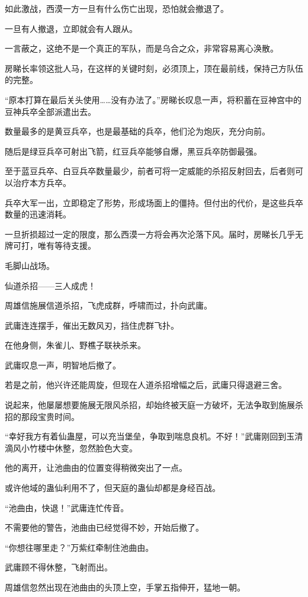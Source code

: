 \begin{this_body}
如此激战，西漠一方一旦有什么伤亡出现，恐怕就会撤退了。

一旦有人撤退，立即就会有人跟从。

一言蔽之，这绝不是一个真正的军队，而是乌合之众，非常容易离心涣散。

房睇长率领这批人马，在这样的关键时刻，必须顶上，顶在最前线，保持己方队伍的完整。

“原本打算在最后关头使用……没有办法了。”房睇长叹息一声，将积蓄在豆神宫中的豆神兵卒全部派遣出去。

数量最多的是黄豆兵卒，也是最基础的兵卒，他们沦为炮灰，充分向前。

随后是绿豆兵卒可射出飞箭，红豆兵卒能够自爆，黑豆兵卒防御最强。

至于蓝豆兵卒、白豆兵卒数量最少，前者可将一定威能的杀招反射回去，后者则可以治疗本方兵卒。

兵卒大军一出，立即稳定了形势，形成场面上的僵持。但付出的代价，是这些兵卒数量的迅速消耗。

一旦折损超过一定的限度，那么西漠一方将会再次沦落下风。届时，房睇长几乎无牌可打，唯有等待支援。

毛脚山战场。

仙道杀招——三人成虎！

周雄信施展信道杀招，飞虎成群，呼啸而过，扑向武庸。

武庸连连摆手，催出无数风刃，挡住虎群飞扑。

在他身侧，朱雀儿、野樵子联袂杀来。

武庸叹息一声，明智地后撤了。

若是之前，他兴许还能周旋，但现在人道杀招增幅之后，武庸只得退避三舍。

说起来，他屡屡想要施展无限风杀招，却始终被天庭一方破坏，无法争取到施展杀招的那段宝贵时间。

“幸好我方有着仙蛊屋，可以充当堡垒，争取到喘息良机。不好！”武庸刚回到玉清滴风小竹楼中休整，忽然脸色大变。

他的离开，让池曲由的位置变得稍微突出了一点。

或许他域的蛊仙利用不了，但天庭的蛊仙却都是身经百战。

“池曲由，快退！”武庸连忙传音。

不需要他的警告，池曲由已经觉得不妙，开始后撤了。

“你想往哪里走？”万紫红牵制住池曲由。

武庸顾不得休整，飞射而出。

周雄信忽然出现在池曲由的头顶上空，手掌五指伸开，猛地一朝。


\end{this_body}
